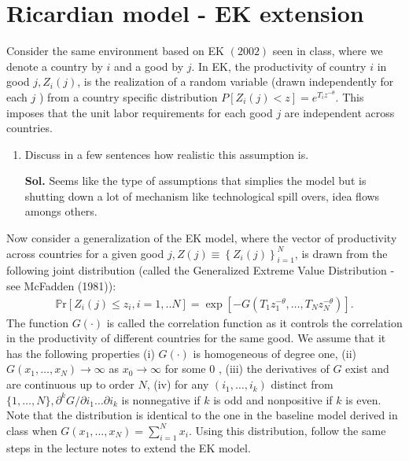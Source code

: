 \documentclass[12pt,oneside,reqno]{amsart}
\newcommand{\pr}{\mathbb{P}\mathrm{r}}
\begin{document}
\section{Ricardian model - EK extension}
Consider the same environment based on EK $(2002)$ seen in class, where we denote a country by $i$ and a good by $j$. In EK, the productivity of country $i$ in good $j, Z_i(j)$, is the realization of a random variable (drawn independently for each $j$ ) from a country specific distribution $P\left[Z_i(j)<z\right]=e^{T_i z^{-\theta}}$. This imposes that the unit labor requirements for each good $j$ are independent across countries.
\begin{enumerate}
    \item Discuss in a few sentences how realistic this assumption is.
    \item[\textbf{Sol.}] Seems like the type of assumptions that simplies the model but is shutting down a lot of mechanism like technological spill overs, idea flows amongs others. 
\end{enumerate}
Now consider a generalization of the EK model, where the vector of productivity across countries for a given good $j, Z(j) \equiv\left\{Z_i(j)\right\}_{i=1}^N$, is drawn from the following joint distribution (called the Generalized Extreme Value Distribution - see McFadden (1981)):
\begin{align*}
\pr\left[Z_i(j) \leq z_i, i=1, . . N\right]=\exp \left[-G\left(T_1 z_1^{-\theta}, \ldots, T_N z_N^{-\theta}\right)\right] .
\end{align*}
The function $G(\cdot)$ is called the correlation function as it controls the correlation in the productivity of different countries for the same good. We assume that it has the following properties (i) $G(\cdot)$ is homogeneous of degree one, (ii) $G\left(x_1, \ldots, x_N\right) \rightarrow \infty$ as $x_0 \rightarrow \infty$ for some 0 , (iii) the derivatives of $G$ exist and are continuous up to order $N$, (iv) for any $\left(i_1, \ldots, i_k\right)$ distinct from $\{1, \ldots, N\}, \partial^k G / \partial i_1 \ldots \partial i_k$ is nonnegative if $k$ is odd and nonpositive if $k$ is even. Note that the distribution is identical to the one in the baseline model derived in class when $G\left(x_1, \ldots, x_N\right)=\sum_{i=1}^N x_i$. Using this distribution, follow the same steps in the lecture notes to extend the EK model.
\end{document}

